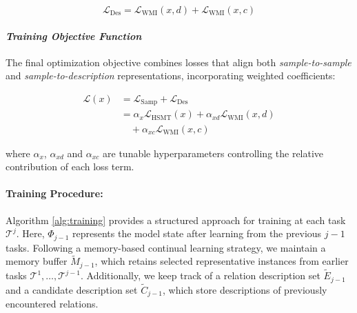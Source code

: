\begin{equation}
\mathcal{L}_{\textrm{Des}} = \mathcal{L}_{\textrm{WMI}}(x, d) + \mathcal{L}_{\textrm{WMI}}(x, c) 
\end{equation}

\paragraph{\textit{Training Objective Function}}
The final optimization objective combines losses that align both \textit{sample-to-sample} and \textit{sample-to-description} representations, incorporating weighted coefficients:

\begin{equation}
\begin{aligned}
\mathcal{L}(x) &= \mathcal{L}_{\textrm{Samp}} + \mathcal{L}_{\textrm{Des}}  \\ 
               &= \alpha_{x} \mathcal{L}_{\textrm{HSMT}}(x) 
               + \alpha_{xd} \mathcal{L}_{\textrm{WMI}}(x,d) \\
               &\quad + \alpha_{xc} \mathcal{L}_{\textrm{WMI}}(x,c)
\end{aligned}
\label{eq:total_loss}
\end{equation}

where $\alpha_{x}$, $\alpha_{xd}$ and $\alpha_{xc}$ are tunable hyperparameters controlling the relative contribution of each loss term.
\label{sec:procedure}
\paragraph{Training Procedure:}
Algorithm \ref{alg:training} provides a structured approach for training at each task $\mathcal{T}^j$. Here, $\Phi_{j-1}$ represents the model state after learning from the previous $j-1$ tasks. Following a memory-based continual learning strategy, we maintain a memory buffer $\tilde{M}_{j-1}$, which retains selected representative instances from earlier tasks ${\mathcal{T}^1, \dots, \mathcal{T}^{j-1}}$. Additionally, we keep track of a relation description set $\tilde{E}_{j-1}$ and a candidate description set $\tilde{C}_{j-1}$, which store descriptions of previously encountered relations.


